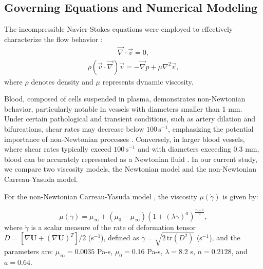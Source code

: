 ﻿\documentclass[12pt,a4paper]{article}
\theoremstyle{definition}
\numberwithin{equation}{section}
\begin{document}
\subsection{\label{sec:governing_equations}Governing Equations and Numerical Modeling} 

\hspace*{\parindent} The incompressible Navier-Stokes equations were employed to effectively characterize the flow behavior \cite{6}:
\begin{align}\label{eq:continuity}
\vec{\nabla} \cdot \vec{v} = 0,
\end{align}
\begin{align}\label{eq:navier_stokes}
\rho (\vec{v} \cdot \vec{\nabla}) \vec{v} = -\vec{\nabla} p + \mu \nabla^2 \vec{v},
\end{align} 
where $\rho$ denotes density and $\mu$ represents dynamic viscosity.

Blood, composed of cells suspended in plasma, demonstrates non-Newtonian behavior, particularly notable in vessels with diameters smaller than 1 mm. Under certain pathological and transient conditions, such as artery dilation and bifurcations, shear rates may decrease below \(100 \, \text{s}^{-1}\), emphasizing the potential importance of non-Newtonian processes \cite{7, 29, 30}. Conversely, in larger blood vessels, where shear rates typically exceed \(100 \, \text{s}^{-1}\) and with diameters exceeding 0.3 mm, blood can be accurately represented as a Newtonian fluid \cite{26, 27}. In our current study, we compare two viscosity models, the Newtonian model and the non-Newtonian Carreau-Yasuda model.

For the non-Newtonian Carreau-Yasuda model \cite{32}, the viscosity $\mu(\dot{\gamma})$ is given by:

\begin{equation}
\mu(\dot{\gamma}) = \mu_{\infty} + (\mu_0 - \mu_{\infty}) \left(1 + (\lambda\dot{\gamma})^a \right)^{\frac{n-1}{a}},
\end{equation}
where \(\dot{\gamma}\) is a scalar measure of the rate of deformation tensor \(D = [\nabla \mathbf{U} + (\nabla \mathbf{U})^T]/{2}\) (s\(^{-1}\)), defined as \(\dot{\gamma} = \sqrt{2 \, \text{tr}(D^2)}\) (s\(^{-1}\)), and the parameters are: $\mu_{\infty} = 0.0035$ Pa-s, $\mu_0 = 0.16$ Pa-s, $\lambda = 8.2$ s, $n = 0.2128$, and $a = 0.64$.
\end{document}
